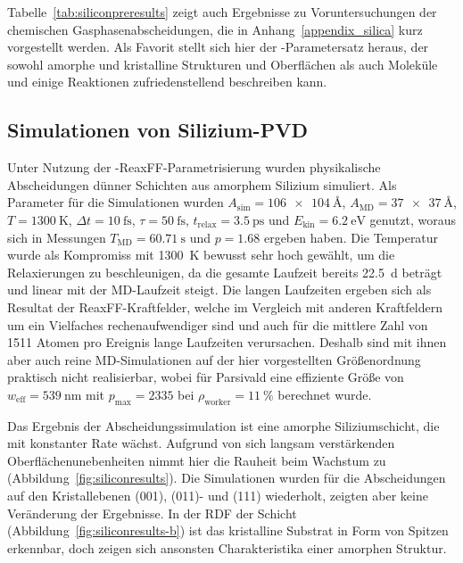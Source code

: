 Tabelle~\ref{tab:siliconpreresults} zeigt auch Ergebnisse zu Voruntersuchungen der chemischen Gasphasenabscheidungen, die in Anhang~\ref{appendix_silica} kurz vorgestellt werden.
Als Favorit stellt sich hier der -Parametersatz heraus, der sowohl amorphe und kristalline Strukturen und Oberflächen als auch Moleküle und einige Reaktionen zufriedenstellend beschreiben kann.

\subsection{Simulationen von Silizium-PVD}

Unter Nutzung der -ReaxFF-Parametrisierung wurden physikalische Abscheidungen dünner Schichten aus amorphem Silizium simuliert.
Als Parameter für die Simulationen wurden $A_\text{sim} = \SI{106x104}{\angstrom}$, $A_\text{MD} = \SI{37x37}{\angstrom}$, $T = \SI{1300}{\kelvin}$, $\Delta t = \SI{10}{\femto\second}$, $\tau = \SI{50}{\femto\second}$, $t_\text{relax} = \SI{3.5}{\pico\second}$ und $E_\text{kin} = \SI{6.2}{\electronvolt}$ genutzt, woraus sich in Messungen $T_\text{MD} = \SI{60.71}{\second}$ und $p = \num{1.68}$ ergeben haben.
Die Temperatur wurde als Kompromiss mit \SI{1300}{\kelvin} bewusst sehr hoch gewählt, um die Relaxierungen zu beschleunigen, da die gesamte Laufzeit bereits \SI{22.5}{\day} beträgt und linear mit der MD-Laufzeit steigt.
Die langen Laufzeiten ergeben sich als Resultat der ReaxFF-Kraftfelder, welche im Vergleich mit anderen Kraftfeldern um ein Vielfaches rechenaufwendiger sind und auch für die mittlere Zahl von \num{1511} Atomen pro Ereignis lange Laufzeiten verursachen.
Deshalb sind mit ihnen aber auch reine MD-Simulationen auf der hier vorgestellten Größenordnung praktisch nicht realisierbar, wobei für Parsivald eine effiziente Größe von $w_\text{eff} = \SI{539}{\nano\meter}$ mit $p_\text{max} = \num{2335}$ bei $\rho_\text{worker} = \SI{11}{\percent}$ berechnet wurde.

Das Ergebnis der Abscheidungssimulation ist eine amorphe Siliziumschicht, die mit konstanter Rate wächst.
Aufgrund von sich langsam verstärkenden Oberflächenunebenheiten nimmt hier die Rauheit beim Wachstum zu (Abbildung~\ref{fig:siliconresults}).
Die Simulationen wurden für die Abscheidungen auf den Kristallebenen (001), (011)- und (111) wiederholt, zeigten aber keine Veränderung der Ergebnisse.
In der RDF der Schicht (Abbildung~\ref{fig:siliconresults-b}) ist das kristalline Substrat in Form von Spitzen erkennbar, doch zeigen sich ansonsten Charakteristika einer amorphen Struktur.

